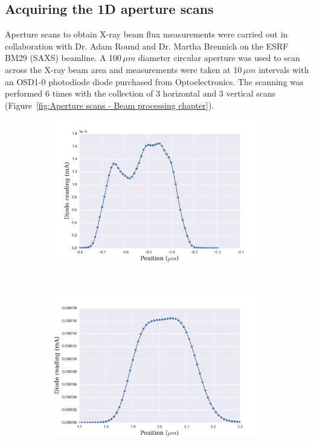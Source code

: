 \subsection{Acquiring the 1D aperture scans}
\label{sub:Acquiring the 1D aperture scans}
Aperture scans to obtain X-ray beam flux measurements were carried out in collaboration with Dr. Adam Round and Dr. Martha Brennich on the ESRF BM29 (SAXS) beamline.
A 100$\,\mu m$ diameter circular aperture was used to scan across the X-ray beam area and measurements were taken at 10$\,\mu m$ intervals with an OSD1-0 photodiode diode purchased from Optoelectronics.
The scanning was performed 6 times with the collection of 3 horizontal and 3 vertical scans (Figure~\ref{fig:Aperture scans - Beam processing chapter}).
\begin{figure}
    \centering
    \begin{subfigure}[b]{0.9\textwidth}
            \centering
            \includegraphics[width=\textwidth]{figures/beam/SAXS_vertical_aperture_scan.pdf}
            \caption{}
            \label{fig:Vertical aperture scans - Beam processing chapter}
    \end{subfigure}
    \\
    \begin{subfigure}[b]{0.9\textwidth}
            \centering
            \includegraphics[width=\textwidth]{figures/beam/SAXS_horizontal_aperture_scan.pdf}

\end{subfigure}
\end{figure}

